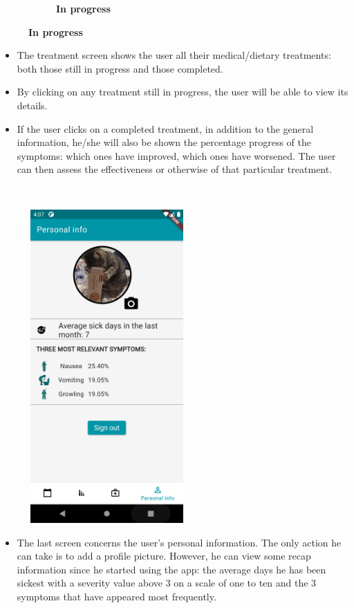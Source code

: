 \documentclass [12pt]{article}
\begin{document}
\begin{description}[leftmargin=1cm,rightmargin=1cm]
\begin{figure}[h!]
\begin{subfigure}[tr]{0.3\linewidth}
\caption{\textbf{In progress}}
\end{subfigure}
\hspace*{\fill}
\end{figure}
\begin{itemize}[•]
\item The treatment screen shows the user all their medical/dietary treatments: both those still in progress and those completed. 
\item By clicking on any treatment still in progress, the user will be able to view its details. 
\item If the user clicks on a completed treatment, in addition to the general information, he/she will also be shown the percentage progress of the symptoms: which ones have improved, which ones have worsened. The user can then assess the effectiveness or otherwise of that particular treatment. 
\end{itemize}
\clearpage

\item [ 7)Personal page]
\
\
\
\begin{figure}[h!]
\centering
\includegraphics[width=6cm,height=12cm]{PersonalPage.PNG}
\end{figure}
\begin{itemize}[•]
\item The last screen concerns the user's personal information. The only action he can take is to add a profile picture. However, he can view some recap information since he started using the app: the average days he has been sickest with a severity value above 3 on a scale of one to ten and the 3 symptoms that have appeared most frequently.
\end{itemize}

\end{description}
\end{document}
